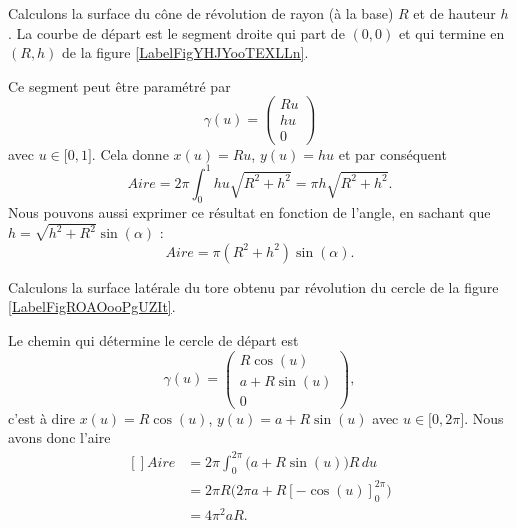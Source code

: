 \begin{example}
    Calculons la surface du cône de révolution de rayon (à la base) $R$ et de hauteur $h$. La courbe de départ est le segment droite qui part de $(0,0)$ et qui termine en $(R,h)$ de la figure \ref{LabelFigYHJYooTEXLLn}. %
\newcommand{\CaptionFigYHJYooTEXLLn}{En faisant tourner cette droite autour de l'axe $X$, nous obtenons un cône.}

    
    Ce segment peut être paramétré par
    \begin{equation}
        \gamma(u)=\begin{pmatrix}
            Ru    \\ 
            hu    \\ 
            0    
        \end{pmatrix}
    \end{equation}
    avec $u\in\mathopen[ 0 , 1 \mathclose]$. Cela donne $x(u)=Ru$, $y(u)=hu$ et par conséquent
    \begin{equation}
        Aire=2\pi\int_0^1hu\sqrt{R^2+h^2}=\pi h\sqrt{R^2+h^2}.
    \end{equation}
    Nous pouvons aussi exprimer ce résultat en fonction de l'angle, en sachant que $h=\sqrt{h^2+R^2}\sin(\alpha)$ :
    \begin{equation}
        Aire=\pi(R^2+h^2)\sin(\alpha).
    \end{equation}
    
\end{example}

\begin{example}
    Calculons la surface latérale du tore obtenu par révolution du cercle de la figure  \ref{LabelFigROAOooPgUZIt}. %
\newcommand{\CaptionFigROAOooPgUZIt}{Si nous tournons ce cercle autour de l'axe $X$, nous obtenons un tore de rayon «externe» $a$ et de rayon «interne» $R$.}


    Le chemin qui détermine le cercle de départ est
    \begin{equation}
        \gamma(u)=\begin{pmatrix}
            R\cos(u)    \\ 
            a+R\sin(u)    \\ 
            0    
        \end{pmatrix},
    \end{equation}
    c'est à dire $x(u)=R\cos(u)$, $y(u)=a+R\sin(u)$ avec $u\in\mathopen[ 0 , 2\pi \mathclose]$. Nous avons donc l'aire
    \begin{equation}
        \begin{aligned}[]
            Aire&=2\pi\int_0^{2\pi}\big( a+R\sin(u) \big)R\,du\\
            &=2\pi R\big( 2\pi a+R[-\cos(u)]_0^{2\pi} \big)\\
            &=4\pi^2aR.
        \end{aligned}
    \end{equation}
\end{example}

